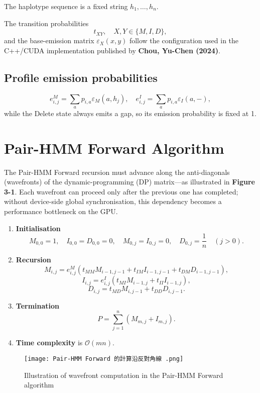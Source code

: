 \documentclass[PhD]{PHlab-thesis}
\begin{document}
The haplotype sequence is a fixed string $h_1, \dots, h_n$.

The transition probabilities
\[
t_{XY}, \quad X,Y \in \{M,I,D\},
\]
and the base-emission matrix $\varepsilon_X(x,y)$ follow the configuration used in the C++/CUDA implementation published by \textbf{Chou, Yu-Chen (2024)}.

\subsection{Profile emission probabilities}
\[
e_{i,j}^M = \sum_a p_{i,a} \varepsilon_M(a, h_j), \quad e_{i,j}^I = \sum_a p_{i,a} \varepsilon_I(a, -),
\]
while the Delete state always emits a gap, so its emission probability is fixed at 1.

\section{Pair-HMM Forward Algorithm}
The Pair-HMM Forward recursion must advance along the anti-diagonals (wavefronts) of the dynamic-programming (DP) matrix—as illustrated in \textbf{Figure 3-1}. Each wavefront can proceed only after the previous one has completed; without device-side global synchronisation, this dependency becomes a performance bottleneck on the GPU.

\begin{enumerate}
    \item \textbf{Initialisation}
    \[
    M_{0,0} = 1, \quad I_{0,0} = D_{0,0} = 0, \quad M_{0,j} = I_{0,j} = 0, \quad D_{0,j} = \frac{1}{n} \quad (j > 0).
    \]
    \item \textbf{Recursion}
    \[
    M_{i,j} = e_{i,j}^M (t_{MM} M_{i-1,j-1} + t_{IM} I_{i-1,j-1} + t_{DM} D_{i-1,j-1}),
    \]
    \[
    I_{i,j} = e_{i,j}^I (t_{MI} M_{i-1,j} + t_{II} I_{i-1,j}),
    \]
    \[
    D_{i,j} = t_{MD} M_{i,j-1} + t_{DD} D_{i,j-1}.
    \]
    \item \textbf{Termination}
    \[
    P = \sum_{j=1}^n (M_{m,j} + I_{m,j}).
    \]
    \item \textbf{Time complexity} is $\mathcal{O}(mn)$.
\end{enumerate}


\begin{figure}[htbp]
    \centering
    \texttt{[image: Pair-HMM Forward 的計算沿反對角線 .png]}
    \caption{Illustration of wavefront computation in the Pair-HMM Forward algorithm}
    \label{fig:pairhmm-wavefront}
\end{figure}
\end{document}
